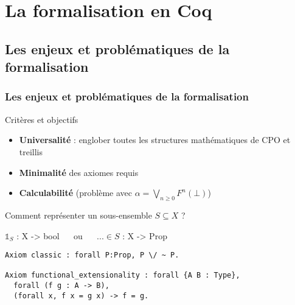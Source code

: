 \documentclass{beamer}
\newcommand\code[1]{{\fontfamily{lmtt}\selectfont #1}}
\begin{document}
\section{La formalisation en Coq}

\subsection{Les enjeux et problématiques de la formalisation}

\begin{frame}[fragile]
\frametitle{Les enjeux et problématiques de la formalisation}

\begin{block}{Critères et objectifs}
\begin{itemize}
\item \textbf{Universalité} : englober toutes les structures mathématiques de CPO et treillis
\item<2-> \textbf{Minimalité} des axiomes requis
\item<3-> \textbf{Calculabilité} (problème avec $ \alpha = \bigvee_{n \geq 0} F^n(\bot)$)
\end{itemize}
\end{block}

Comment représenter un sous-ensemble $S \subseteq X$ ? 

$\mathbb{1}_S$ \code{: X -> bool} ~~ ou ~~ $... \in S $ \code{: X -> Prop}

\medskip

\pause
\begin{lstlisting}[frame=single, language = Coq, basicstyle=\scriptsize]
Axiom classic : forall P:Prop, P \/ ~ P.

Axiom functional_extensionality : forall {A B : Type},
  forall (f g : A -> B),
  (forall x, f x = g x) -> f = g.
\end{lstlisting}


\end{frame}
\end{document}
